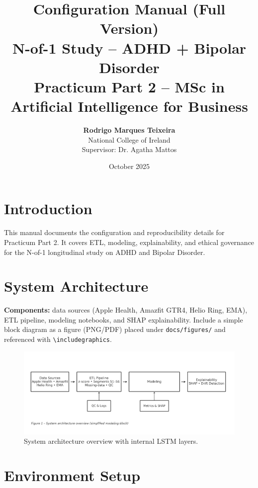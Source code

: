 \documentclass[12pt,a4paper]{article}
\title{\textbf{Configuration Manual (Full Version)}\\N-of-1 Study – ADHD + Bipolar Disorder\\\vspace{0.4cm}\large Practicum Part 2 – MSc in Artificial Intelligence for Business}
\author{\textbf{Rodrigo Marques Teixeira} \\ National College of Ireland \\ Supervisor: Dr. Agatha Mattos}
\date{October 2025}
\begin{document}
\maketitle
\tableofcontents
\newpage

\section{Introduction}
This manual documents the configuration and reproducibility details for Practicum Part 2. It covers ETL, modeling, explainability, and ethical governance for the N-of-1 longitudinal study on ADHD and Bipolar Disorder.

\section{System Architecture}
\textbf{Components:} data sources (Apple Health, Amazfit GTR4, Helio Ring, EMA), ETL pipeline, modeling notebooks, and SHAP explainability. Include a simple block diagram as a figure (PNG/PDF) placed under \texttt{docs/figures/} and referenced with \verb|\includegraphics|.

\begin{figure}[H]
  \centering
  \includegraphics[width=0.9\linewidth]{docs/figures/system-architecture-paper-v3.png}
  \caption{System architecture overview with internal LSTM layers.}
  \label{fig:architecture}
\end{figure}

\section{Environment Setup}
\end{document}
